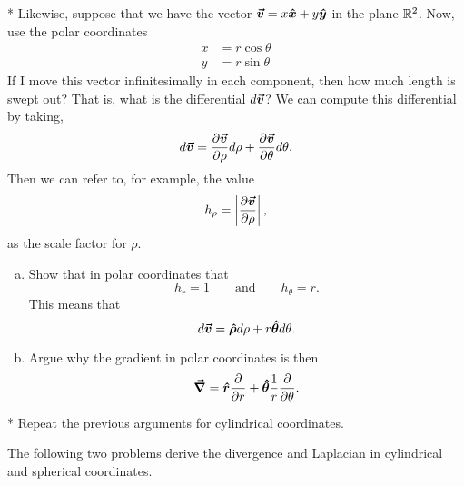 \documentclass[12pt]{article} %
\begin{document}
\vspace*{1cm}
\begin{problem} *
    Likewise, suppose that we have the vector $\boldsymbol{\boldsymbol{\vec{v}}} = x\boldsymbol{\hat{x}} + y\boldsymbol{\hat{y}}$ in the plane $\mathbb{R}^2$.  Now, use the polar coordinates
    \begin{align*}
    x &= r \cos \theta\\
    y &= r \sin \theta
    \end{align*}
    If I move this vector infinitesimally in each component, then how much length is swept out? That is, what is the differential $d\boldsymbol{\boldsymbol{\vec{v}}}$? We can compute this differential by taking,
    \[
    d\boldsymbol{\boldsymbol{\vec{v}}} = \frac{\partial \boldsymbol{\boldsymbol{\vec{v}}}}{\partial \rho}d\rho+\frac{\partial \boldsymbol{\boldsymbol{\vec{v}}}}{\partial \theta}d\theta.
    \]
    Then we can refer to, for example, the value
        \[
        h_\rho = \left| \frac{\partial \boldsymbol{\boldsymbol{\vec{v}}}}{\partial \rho} \right|,
        \]
        as the scale factor for $\rho$.
    \begin{enumerate}[(a)]
        \item Show that in polar coordinates that
        \[
        h_r = 1 \qquad \textrm{and} \qquad h_\theta = r.
        \]
        This means that
        \[
        d\boldsymbol{\boldsymbol{\vec{v}}} =  \boldsymbol{\boldsymbol{\hat{\rho}}} d\rho + r\boldsymbol{\boldsymbol{\hat{\theta}}} d\theta.
        \]
        \item Argue why the gradient in polar coordinates is then
        \[
        \boldsymbol{\vec{\nabla}} = \boldsymbol{\boldsymbol{\hat{r}}} \frac{\partial}{\partial r} + \boldsymbol{\boldsymbol{\hat{\theta}}} \frac{1}{r}\frac{\partial}{\partial \theta}.
        \]
    \end{enumerate}
\end{problem}

\vspace*{1cm}
\begin{problem}
    * Repeat the previous arguments for cylindrical coordinates.
\end{problem}


\vspace*{1cm}
\begin{centering} The following two problems derive the divergence and Laplacian in cylindrical and spherical coordinates.
\end{centering}
\end{document}
